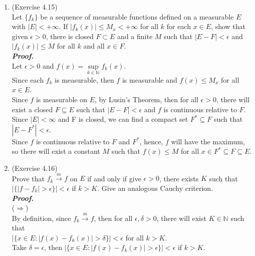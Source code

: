 \documentclass[a4paper,11pt]{article}
\begin{document}
\begin{enumerate}
\item (Exercise 4.15)\\
Let $\{ f_k \}$ be a sequence of measurable functions defined on a measurable $E$ with $|E| < + \infty$. If $|f_k(x)| \leq M_x < + \infty$ for all $k$ for each $x \in E$, show that given $\epsilon > 0$, there is closed $F \subset E$ and a finite $M$ such that $|E - F| < \epsilon$ and $|f_k(x)| \leq M$ for all $k$ and all $x \in F$.\\
\newline
\textit{\textbf {Proof.}}\\
Let $\epsilon > 0$ and $f(x) = \underset{k \in \mathbb{N}}{\sup} f_k(x)$.\\
Since each $f_k$ is measurable, then $f$ is measurable and $f(x) \leq M_x$ for all $x \in E$.\\
Since $f$ is measurable on $E$, by Lusin's Theorem, then for all $\epsilon > 0$, there will exist a closed $F \subseteq E$ such that $|E - F| < \epsilon$ and $f$ is continuous relative to $F$.\\
Since $|E| < \infty$ and F is closed, we can find a compact set $F^* \subseteq F$ such that $|E - F^*| < \epsilon$.\\
Since $f$ is continuous relative to $F$ and $F^*$, hence, $f$ will have the maximum, so there will exist a constant $M$ such that $f(x) \leq M$ for all $x \in F^* \subseteq F \subseteq E$.\\





\item (Exercise 4.16)\\
Prove that $f_k \overset{m}{\to} f$ on $E$ if and only if give $\epsilon > 0$, there exists $K$ such that $|\{ |f - f_k| > \epsilon \}| < \epsilon$ if $k > K$. Give an analogous Cauchy criterion.\\
\newline
\textit{\textbf {Proof.}}\\
($\Rightarrow$)\\
By definition, since $f_k \overset{m}{\to} f$, then for all $\epsilon, \delta > 0$, there will exist $K \in \mathbb{N}$ such that \\$|\{ x \in E : | f(x) - f_k(x)| > \delta \}| < \epsilon $ for all $k > K$.\\
Take $\delta = \epsilon$, then $|\{ x \in E : | f(x) - f_k(x)| > \epsilon \}| < \epsilon $ if $k > K$.\\


\end{enumerate}
\end{document}
